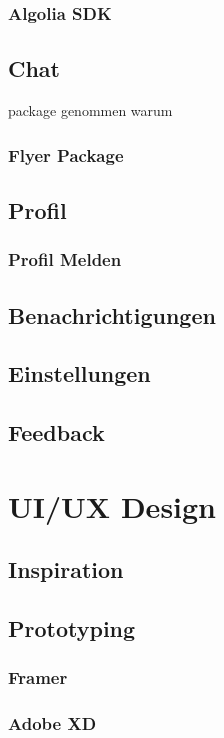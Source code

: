 \subsubsection{Algolia SDK}


\subsection{Chat}
package genommen warum
\subsubsection{Flyer Package}
\subsection{Profil}
\subsubsection{Profil Melden}

\subsection{Benachrichtigungen}
\subsection{Einstellungen}
\subsection{Feedback}


\section{UI/UX Design}
\subsection{Inspiration}

\subsection{Prototyping}
\subsubsection{Framer}
\subsubsection{Adobe XD}


